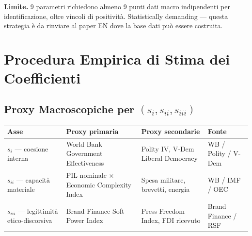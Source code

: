 \Conj{} \textbf{Limite.} \(9\) parametri richiedono almeno 9 punti dati
macro indipendenti per identificazione, oltre vincoli di positività.
Statistically demanding --- questa strategia è da rinviare al paper EN
dove la base dati può essere costruita.



\section{Procedura Empirica di Stima dei
Coefficienti}\label{procedura-empirica-di-stima-dei-coefficienti}

\subsection{\texorpdfstring{Proxy Macroscopiche per
\((s_i, s_{ii}, s_{iii})\)}{Proxy Macroscopiche per (s\_i, s\_\{ii\}, s\_\{iii\})}}\label{proxy-macroscopiche-per-s_i-s_ii-s_iii}

{\def\LTcaptype{none} %
{\small\begin{longtable}[]{@{}
  >{\raggedright\arraybackslash}p{}
  >{\raggedright\arraybackslash}p{}
  >{\raggedright\arraybackslash}p{}
  >{\raggedright\arraybackslash}p{}@{}}
\toprule\noalign{}
\begin{minipage}[b]{\linewidth}\raggedright
Asse
\end{minipage} & \begin{minipage}[b]{\linewidth}\raggedright
Proxy primaria
\end{minipage} & \begin{minipage}[b]{\linewidth}\raggedright
Proxy secondarie
\end{minipage} & \begin{minipage}[b]{\linewidth}\raggedright
Fonte
\end{minipage} \\
\midrule\noalign{}
\endhead
\bottomrule\noalign{}
\endlastfoot
\(s_i\) --- coesione interna & World Bank Government Effectiveness &
Polity IV, V-Dem Liberal Democracy & WB / Polity / V-Dem \\
\(s_{ii}\) --- capacità materiale & PIL nominale $\times$ Economic Complexity
Index & Spesa militare, brevetti, energia & WB / IMF / OEC \\
\(s_{iii}\) --- legittimità etico-discorsiva & Brand Finance Soft Power
Index & Press Freedom Index, FDI ricevuto & Brand Finance / RSF \\
\end{longtable}}
}

